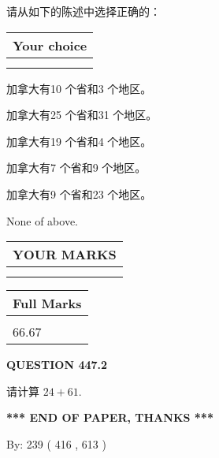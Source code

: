 \documentclass{ctexart}
\begin{document}
  
请从如下的陈述中选择正确的：
  
  
\noindent\hspace{3.0in} \begin{tabular}{|l|}
\hline
Your choice \\
\hline
 \\ 
 \\ 
\hline
\end{tabular}
  
  
 
 
加拿大有10 个省和3 个地区。
 
 
加拿大有25 个省和31 个地区。
 
 
加拿大有19 个省和4 个地区。
 
 
加拿大有7 个省和9 个地区。
 
 
加拿大有9 个省和23 个地区。
 
 
 None of above.
 
 
  
\vspace{0.2in}
  
\noindent\begin{tabular}{|l|}
\hline
 YOUR MARKS  \\
\hline
 \\ 
 \\ 
\hline
\end{tabular}
\hspace{0.05in} \begin{tabular}{|l|}
\hline
 Full Marks  \\
\hline
 \\ 
66.67 \\
\hline
\end{tabular}
{\textbf{\Large{QUESTION
447.2 
}}}
  
  
 
请计算 $ %
24 +  %
61 $.
 

 

 
   
   
 \vspace{0.2in}
 
   
   
   
   
\vspace{1.0in} 
{\textbf{\large{ *** END OF PAPER, THANKS *** }}} 
   
   
\hspace{1.0in} By: 
 239 ( 416 ,  613 )
   
\end{document}
